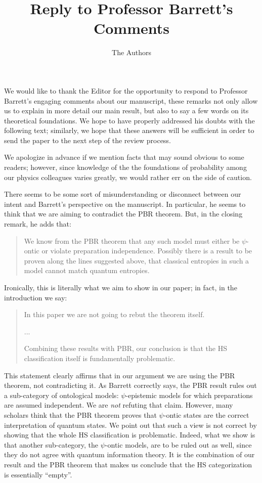 \documentclass[11pt]{article}
\begin{document}
	
	
\title{\textbf{Reply to Professor Barrett's Comments}}

\author{The Authors}

\maketitle

	
We would like to thank the Editor for the opportunity to respond to Professor Barrett's engaging comments about our manuscript, these remarks not only allow us to explain in more detail our main result, but also to say a few words on its theoretical foundations. We hope to have properly addressed his doubts with the following text; similarly, we hope that these answers will be sufficient in order to send the paper to the next step of the review process.

We apologize in advance if we mention facts that may sound obvious to some readers; however, since knowledge of the the foundations of probability among our physics colleagues varies greatly, we would rather err on the side of caution.
\vspace{2mm}

There seems to be some sort of misunderstanding or disconnect between our intent and Barrett's perspective on the manuscript. In particular, he seems to think that we are aiming to contradict the PBR theorem. But, in the closing remark, he adds that:
\begin{quote}
We know from the PBR theorem that	 any such model must either be $\psi$-ontic or violate preparation independence. Possibly there is a result to be proven along the lines suggested above, that classical entropies in such a model cannot match quantum entropies.
\end{quote}

Ironically, this is literally what we aim to show in our paper; in fact, in the introduction we say:
\begin{quote}		
In this paper we are not going to rebut the theorem itself.
			
			...
		
Combining these results with PBR, our conclusion is that the HS classification itself is fundamentally problematic.
\end{quote}

This statement clearly affirms that in our argument we are using the PBR theorem, not contradicting it. As Barrett correctly says, the PBR result rules out a sub-category of ontological models: $\psi$-epistemic models for which preparations are assumed independent. We are \emph{not} refuting that claim. However, many scholars think that the PBR theorem proves that $\psi$-ontic states are the correct interpretation of quantum states. We point out that such a view is not correct by showing that the whole HS classification is problematic. Indeed, what we show is that another sub-category, the $\psi$-ontic models, are to be ruled out as well, since they do not agree with quantum information theory. It is the combination of our result and the PBR theorem that makes us conclude that the HS categorization is essentially ``empty''.
\end{document}
